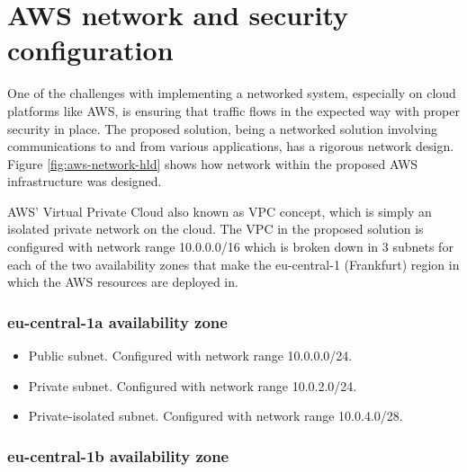 


\section{AWS network and security configuration}
\label{sec:aws-network}

One of the challenges with implementing a networked system, especially on cloud platforms like AWS, is ensuring that traffic flows in the expected way with proper security in place. The proposed solution, being a networked solution involving communications to and from various applications, has a rigorous network design. Figure \ref{fig:aws-network-hld} shows how network within the proposed AWS infrastructure was designed.

AWS' Virtual Private Cloud also known as VPC concept, which is simply an isolated private network on the cloud. The VPC in the proposed solution is configured with network range 10.0.0.0/16 which is broken down in 3 subnets for each of the two availability zones that make the eu-central-1 (Frankfurt) region in which the AWS resources are deployed in.



\subsubsection*{eu-central-1a availability zone}
\label{eu-central-1a-az}

\begin{itemize}
    \item Public subnet. Configured with network range 10.0.0.0/24.
    \item Private subnet. Configured with network range 10.0.2.0/24.
    \item Private-isolated subnet. Configured with network range 10.0.4.0/28.
\end{itemize}




\subsubsection*{eu-central-1b availability zone}
\label{eu-central-1b-az}

